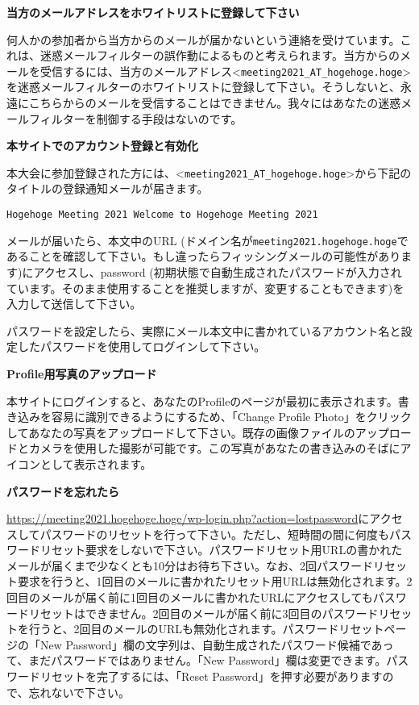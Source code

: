 \documentclass[titlepage,10pt,a4paper,uplatex]{jsbook}
\newenvironment{content}{\begin{shaded}\vspace{-1em}\raggedright\ttfamily\footnotesize\setlength{\baselineskip}{1.4em}}{\end{shaded}\vspace{-1em}}
\renewcommand{\textbf}[1]{{\bfseries\sffamily#1}}
\begin{document}
\begin{content}
\textbf{\Large 当方のメールアドレスをホワイトリストに登録して下さい}

何人かの参加者から当方からのメールが届かないという連絡を受けています。これは、迷惑メールフィルターの誤作動によるものと考えられます。当方からのメールを受信するには、当方のメールアドレス{\textless}\texttt{meeting2021\_AT\_hogehoge.hoge}{\textgreater}を迷惑メールフィルターのホワイトリストに登録して下さい。そうしないと、永遠にこちらからのメールを受信することはできません。我々にはあなたの迷惑メールフィルターを制御する手段はないのです。

\textbf{\Large 本サイトでのアカウント登録と有効化}

本大会に参加登録された方には、{\textless}\texttt{meeting2021\_AT\_hogehoge.hoge}{\textgreater}から下記のタイトルの登録通知メールが届きます。

\texttt{{\lbrack}Hogehoge Meeting 2021{\rbrack} Welcome to Hogehoge Meeting 2021}

メールが届いたら、本文中のURL (ドメイン名が\texttt{meeting2021.hogehoge.hoge}であることを確認して下さい。もし違ったらフィッシングメールの可能性があります)にアクセスし、password (初期状態で自動生成されたパスワードが入力されています。そのまま使用することを推奨しますが、変更することもできます)を入力して送信して下さい。

パスワードを設定したら、実際にメール本文中に書かれているアカウント名と設定したパスワードを使用してログインして下さい。

\textbf{\Large Profile用写真のアップロード}

本サイトにログインすると、あなたのProfileのページが最初に表示されます。書き込みを容易に識別できるようにするため、「Change Profile Photo」をクリックしてあなたの写真をアップロードして下さい。既存の画像ファイルのアップロードとカメラを使用した撮影が可能です。この写真があなたの書き込みのそばにアイコンとして表示されます。

\textbf{\Large パスワードを忘れたら}

\url{https://meeting2021.hogehoge.hoge/wp-login.php?action=lostpassword}にアクセスしてパスワードのリセットを行って下さい。ただし、短時間の間に何度もパスワードリセット要求をしないで下さい。パスワードリセット用URLの書かれたメールが届くまで少なくとも10分はお待ち下さい。なお、2回パスワードリセット要求を行うと、1回目のメールに書かれたリセット用URLは無効化されます。2回目のメールが届く前に1回目のメールに書かれたURLにアクセスしてもパスワードリセットはできません。2回目のメールが届く前に3回目のパスワードリセットを行うと、2回目のメールのURLも無効化されます。パスワードリセットページの「New Password」欄の文字列は、自動生成されたパスワード候補であって、まだパスワードではありません。「New Password」欄は変更できます。パスワードリセットを完了するには、「Reset Password」を押す必要がありますので、忘れないで下さい。


\end{content}
\end{document}
